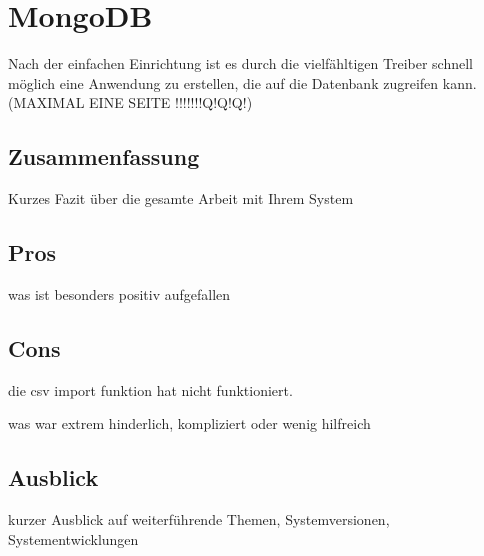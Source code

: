 \section{MongoDB}
Nach der einfachen Einrichtung ist es durch die vielf\"ahltigen Treiber schnell m\"oglich eine Anwendung zu erstellen, die auf die Datenbank zugreifen kann.\\
(MAXIMAL EINE SEITE !!!!!!!Q!Q!Q!)
\subsection{Zusammenfassung}

Kurzes Fazit über die gesamte Arbeit mit Ihrem System
\subsection{Pros}
was ist besonders positiv aufgefallen
\subsection{Cons}
die csv import funktion hat nicht funktioniert.

was war extrem hinderlich, kompliziert oder wenig hilfreich
\subsection{Ausblick}
kurzer Ausblick auf weiterführende Themen, Systemversionen, Systementwicklungen
